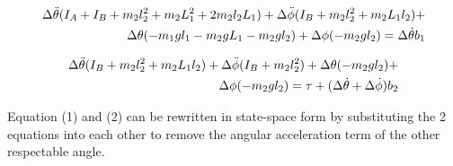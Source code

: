 \documentclass[a4paper,12pt]{article}
\begin{document}
\begin{appendices}
		\begin{align}
		\Delta{\ddot{\theta}}(I_{A}+I_{B}+m_{2}l_{2}^2+m_{2}L_{1}^2+2m_{2}l_{2}L_{1})+\Delta{\ddot{\phi}(I_{B}+m_{2}l_{2}^2+m_{2}L_{1}l_{2})}+ \notag \\
		\Delta{\theta(-m_{1}gl_{1}-m_{2}gL_{1}-m_{2}gl_{2})}+\Delta{\phi(-m_{2}gl_{2})}=\Delta{\dot{\theta}}b_{1}
		\end{align}
		
		\begin{align}
		\Delta{\ddot{\theta}(I_{B}+m_{2}l_{2}^2+m_{2}L_{1}l_{2})}+\Delta{\ddot{\phi}(I_{B}+m_{2}l_{2}^2)}+\Delta{\theta(-m_{2}gl_{2})}+\notag \\ 
		\Delta{\phi(-m_{2}gl_{2})}=\tau + (\Delta{\dot{\theta}}+\Delta{\dot{\phi}})b_{2} 
		\end{align}
		
		Equation (1) and (2) can be rewritten in state-space form by substituting the 2 equations into each other to remove the angular acceleration term of the other respectable angle. 
		

\end{appendices}
\end{document}
